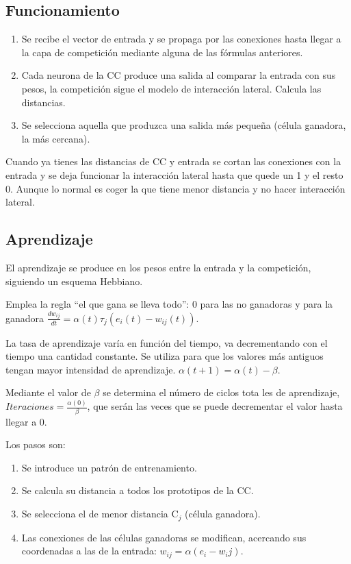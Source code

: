 \documentclass[12pt, twoside, openright]{report} %
\begin{document}
\subsection{Funcionamiento}
\begin{enumerate}
	\item Se recibe el vector de entrada y se propaga por las conexiones hasta llegar a la capa de competición mediante alguna de las fórmulas anteriores.
	\item Cada neurona de la CC produce una salida al comparar la entrada con sus pesos, la competición sigue el modelo de interacción lateral. Calcula las distancias.
	\item Se selecciona aquella que produzca una salida más pequeña (célula ganadora, la más cercana).
\end{enumerate}

Cuando ya tienes las distancias de CC y entrada se cortan las conexiones con la entrada y se deja funcionar la interacción lateral hasta que quede un 1 y el resto 0. Aunque lo normal es coger la que tiene menor distancia y no hacer interacción lateral.

\subsection{Aprendizaje}
El aprendizaje se produce en los pesos entre la entrada y la competición, siguiendo un esquema Hebbiano.

Emplea la regla “el que gana se lleva todo”: 0 para las no ganadoras y para la ganadora $\frac{dw_{ij}}{dt}=\alpha(t)\tau_j (e_i(t)-w_{ij}(t))$.

La tasa de aprendizaje varía en función del tiempo, va decrementando con el tiempo una cantidad constante. Se utiliza para que los valores más antiguos tengan mayor intensidad de aprendizaje. $\alpha(t+1)=\alpha (t) - \beta$.

Mediante el valor de $\beta$ se determina el número de ciclos tota les de aprendizaje, $\textit{Iteraciones}=\frac{\alpha(0)}{\beta}$, que serán las veces que se puede decrementar el valor hasta llegar a 0.

Los pasos son:
\begin{enumerate}
	\item Se introduce un patrón de entrenamiento.
	\item Se calcula su distancia a todos los prototipos de la CC.
	\item Se selecciona el de menor distancia C$_j$ (célula ganadora).
	\item Las conexiones de las células ganadoras se modifican, acercando sus coordenadas a las de la entrada: $w_{ij}=\alpha(e_i - w_ij)$.
	
\end{enumerate}
\end{document}
